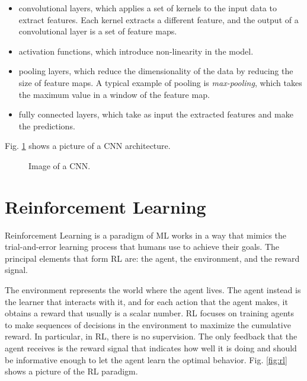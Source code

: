\begin{itemize}
    \item convolutional layers, which applies a set of kernels to the input data to extract features.
    Each kernel extracts a different feature, and the output of a convolutional layer is a set of feature maps.
    \item activation functions, which introduce non-linearity in the model.
    \item pooling layers, which reduce the dimensionality of the data by reducing the size of feature maps.
    A typical example of pooling is \textit{max-pooling}, which takes the maximum value in a window of the feature map.
    \item fully connected layers, which take as input the extracted features and make the predictions.
\end{itemize}

Fig. \ref{fig:cnn} shows a picture of a CNN architecture.

\begin{figure}[ht]
    \begin{center}
        \fbox{\rule[-.5cm]{0cm}{4cm} \rule[-.5cm]{4cm}{0cm}}
    \end{center}
    \caption{Image of a CNN.}
    \label{fig:cnn}
\end{figure}



\section{Reinforcement Learning}
\label{sec:rl}

Reinforcement Learning is a paradigm of ML works in a way that mimics the trial-and-error learning process that humans use to achieve their goals.
The principal elements that form RL are: the agent, the environment, and the reward signal.

The environment represents the world where the agent lives.
The agent instead is the learner that interacts with it, and for each action that the agent makes, it obtains a reward that usually is a scalar number.
RL focuses on training agents to make sequences of decisions in the environment to maximize the cumulative reward.
In particular, in RL, there is no supervision.
The only feedback that the agent receives is the reward signal that indicates how well it is doing and should be informative enough to let the agent learn the optimal behavior.
Fig. \ref{fig:rl} shows a picture of the RL paradigm.


